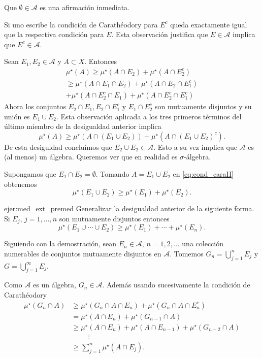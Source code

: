  \begin{demo} Que $\emptyset\in\mathscr{A}$ es una afirmación inmediata. 
 
 Si uno escribe la condición de Carathéodory para $E^c$ queda exactamente igual que la respectiva condición para $E$. Esta observación justifica que $E\in \mathscr{A}$ implica que $E^c\in\mathscr{A}$.
 
 Sean $E_1,E_2\in\mathscr{A}$ y $A\subset X$. Entonces
 \begin{multline*}
  \mu^\star(A)\geq  \mu^\star(A\cap E_2)+ \mu^\star(A\cap E_2^c)\\
  \geq \mu^\star(A\cap E_1\cap E_2)+ \mu^\star(A\cap E_2\cap E_1^c)\\
  + \mu^\star(A\cap E_2^c\cap E_1)+ \mu^\star(A\cap E_2^c\cap E_1^c)
 \end{multline*} 
Ahora los conjuntos $E_2\cap E_1, E_2\cap E_1^c$ y $E_1\cap E_2^c$ son mutuamente disjuntos  y su unión es $E_1\cup E_2$. Esta observación aplicada a los tres primeros términos del último miembro de la desigualdad anterior implica
\[
  \mu^\star(A)\geq \mu^\star(A\cap (E_1\cup E_2))+ \mu^\star(A\cap (E_1\cup E_2)^c).
\]
De esta desiguldad concluímos que $E_2\cup E_2\in\mathscr{A}$. Esto a su vez implica que $\mathscr{A}$ es (al menos) un álgebra. Queremos ver que en realidad es $\sigma$-álgebra.

Supongamos que $E_1\cap E_2=\emptyset$. Tomando $A= E_1\cup E_2$ en \eqref{eq:cond_caraII} obtenemos
\[
 \mu^\star(E_1\cup E_2)\geq \mu^\star(E_1)+\mu^\star(E_2).
 \]

\begin{ejercicio}{ejer:med_ext_premed} Generalizar la desigualdad anterior de la siguiente forma. Si $E_j$, $j=1,\ldots,n$ son mutuamente disjuntos entonces
\[
 \mu^\star(E_1\cup\cdots\cup E_2)\geq \mu^\star(E_1)+\cdots+\mu^\star(E_n).
 \]
 \end{ejercicio}

Siguiendo con la demostración, sean $E_n\in\mathscr{A}$, $n=1,2,\ldots$ una colección numerables de conjuntos mutuamente disjuntos en $\mathscr{A}$. Tomemos $G_n=\bigcup\limits_{j=1}^nE_j$ y $G=\bigcup\limits_{j=1}^{\infty}E_j$.

Como $\mathscr{A}$ es un álgebra, $G_n\in\mathscr{A}$. Además usando sucesivamente la condición de Carathéodory
\begin{equation}\label{eq:dem_cara1}
\begin{split}
  \mu^\star(G_n\cap A) &\geq  \mu^\star(G_n\cap A\cap E_n)+ \mu^\star(G_n\cap A\cap E_n^c)\\
 &=\mu^\star( A\cap E_n)+ \mu^\star(G_{n-1}\cap A)\\
 &\geq \mu^\star( A\cap E_n)+ \mu^\star(A\cap E_{n-1})+ \mu^\star(G_{n-2}\cap A)\\
&\hspace{1cm}\vdots\\
&\geq \sum_{j=1}^n\mu^\star(A\cap E_j).
\end{split}
\end{equation}


\end{demo}
